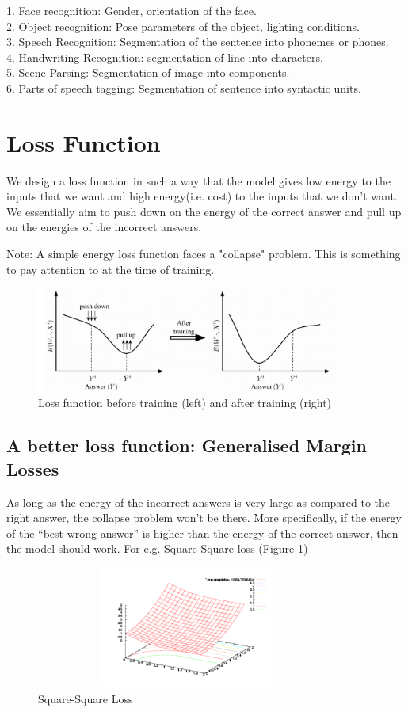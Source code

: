 1. Face recognition: Gender, orientation of the face. \\
2. Object recognition: Pose parameters of the object, lighting conditions.\\
3. Speech Recognition: Segmentation of the sentence into phonemes or phones.\\
4. Handwriting Recognition: segmentation of line into characters.\\
5. Scene Parsing: Segmentation of image into components.\\
6. Parts of speech tagging: Segmentation of sentence into syntactic units.\\

\section{Loss Function}

We design a loss function in such a way that the model gives low energy to the inputs that we want and high energy(i.e. cost) to the inputs that we don’t want. We essentially aim to push down on the energy of the correct answer and pull up on the energies of the incorrect answers.

Note: A simple energy loss function faces a "collapse" problem. This is something to pay attention to at the time of training.

\begin{figure}[t]
\centering
\includegraphics[width=100mm]{lectures/08-b/4.png}
\caption{Loss function before training (left) and after training (right)}
\end{figure}

\subsection{A better loss function: Generalised Margin Losses}
As long as the energy of the incorrect answers is very large as compared to the right answer, the collapse problem won't be there. More specifically, if the energy of the “best wrong answer” is higher than the energy of the correct answer, then the model should work. For e.g. Square Square loss (Figure \ref{fig:sqloss})
\begin{figure}[ht]
\centering
\includegraphics[width=100mm,height=4cm]{lectures/08-b/Square_Square.png}
\caption{Square-Square Loss}
\label{fig:sqloss}
\end{figure}

